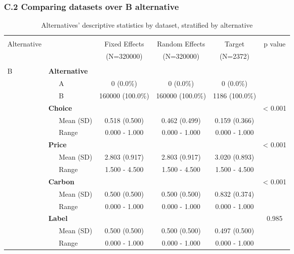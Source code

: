 \documentclass[11pt,]{article}
\begin{document}
\FloatBarrier

\newpage

\hypertarget{c.2-comparing-datasets-over-b-alternative}{%
\subsubsection*{C.2 Comparing datasets over B
alternative}\label{c.2-comparing-datasets-over-b-alternative}}

\FloatBarrier

\begin{table}[!htbp] \centering 
  \caption{Alternatives' descriptive statistics by dataset, stratified by alternative} 
  \label{tab:stratB} 
\begin{tabular}{@{\extracolsep{5pt}}llcccc}
\\[-1.8ex]\hline 
\hline \\[-1.8ex] 
Alternative &  & Fixed Effects  & Random Effects  & Target  & p value\\
 & & (N=320000) & (N=320000) & (N=2372) &  \\
\hline \\[-1.8ex] 
B & \textbf{Alternative} &  &  &  & \\
 & ~~~A & 0 (0.0\%) & 0 (0.0\%) & 0 (0.0\%) & \\
 & ~~~B & 160000 (100.0\%) & 160000 (100.0\%) & 1186 (100.0\%) & \\
 & \textbf{Choice} &  &  &  & < 0.001\\
 & ~~~Mean (SD) & 0.518 (0.500) & 0.462 (0.499) & 0.159 (0.366) & \\
 & ~~~Range & 0.000 - 1.000 & 0.000 - 1.000 & 0.000 - 1.000 & \\
 & \textbf{Price} &  &  &  & < 0.001\\
 & ~~~Mean (SD) & 2.803 (0.917) & 2.803 (0.917) & 3.020 (0.893) & \\
 & ~~~Range & 1.500 - 4.500 & 1.500 - 4.500 & 1.500 - 4.500 & \\
 & \textbf{Carbon} &  &  &  & < 0.001\\
 & ~~~Mean (SD) & 0.500 (0.500) & 0.500 (0.500) & 0.832 (0.374) & \\
 & ~~~Range & 0.000 - 1.000 & 0.000 - 1.000 & 0.000 - 1.000 & \\
 & \textbf{Label} &  &  &  & 0.985\\
 & ~~~Mean (SD) & 0.500 (0.500) & 0.500 (0.500) & 0.497 (0.500) & \\
 & ~~~Range & 0.000 - 1.000 & 0.000 - 1.000 & 0.000 - 1.000 & \\

\end{tabular}
\end{table}
\end{document}
